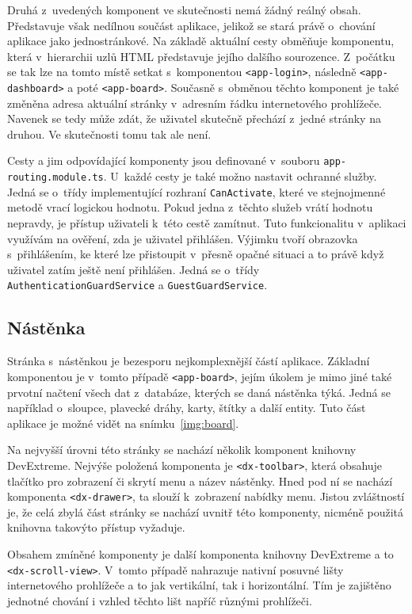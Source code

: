 Druhá z~uvedených komponent ve skutečnosti nemá žádný reálný obsah. Představuje však nedílnou součást aplikace, jelikož se stará právě o~chování aplikace jako jednostránkové. Na základě aktuální cesty obměňuje komponentu, která v~hierarchii uzlů HTML představuje jejího dalšího sourozence. Z~počátku se tak lze na tomto místě setkat s~komponentou \texttt{<app-login>}, následně \texttt{<app-dashboard>} a poté \texttt{<app-board>}. Současně s~obměnou těchto komponent je také změněna adresa aktuální stránky v~adresním řádku internetového prohlížeče. Navenek se tedy může zdát, že uživatel skutečně přechází z~jedné stránky na druhou. Ve skutečnosti tomu tak ale není.

Cesty a jim odpovídající komponenty jsou definované v~souboru \texttt{app-routing.module.ts}. U~každé cesty je také možno nastavit ochranné služby. Jedná se o~třídy implementující rozhraní \texttt{CanActivate}, které ve stejnojmenné metodě vrací logickou hodnotu. Pokud jedna z~těchto služeb vrátí hodnotu nepravdy, je přístup uživateli k~této cestě zamítnut. Tuto funkcionalitu v~aplikaci využívám na ověření, zda je uživatel přihlášen. Výjimku tvoří obrazovka s~přihlášením, ke které lze přistoupit v~přesně opačné situaci a to právě když uživatel zatím ještě není přihlášen. Jedná se o~třídy \texttt{AuthenticationGuardService} a \texttt{GuestGuardService}.


\subsection{Nástěnka}
Stránka s~nástěnkou je bezesporu nejkomplexnější částí aplikace. Základní komponentou je v~tomto případě \texttt{<app-board>}, jejím úkolem je mimo jiné také prvotní načtení všech dat z~databáze, kterých se daná nástěnka týká. Jedná se například o~sloupce, plavecké dráhy, karty, štítky a další entity. Tuto část aplikace je možné vidět na snímku~\ref{img:board}.

Na nejvyšší úrovni této stránky se nachází několik komponent knihovny DevExtreme. Nejvýše položená komponenta je \texttt{<dx-toolbar>}, která obsahuje tlačítko pro zobrazení či skrytí menu a název nástěnky. Hned pod ní se nachází komponenta \texttt{<dx-drawer>}, ta slouží k~zobrazení nabídky menu. Jistou zvláštností je, že celá zbylá část stránky se nachází uvnitř této komponenty, nicméně použitá knihovna takovýto přístup vyžaduje.

Obsahem zmíněné komponenty je další komponenta knihovny DevExtreme a to \texttt{<dx-scroll-view>}. V~tomto případě nahrazuje nativní posuvné lišty internetového prohlížeče a to jak vertikální, tak i horizontální. Tím je zajištěno jednotné chování i vzhled těchto lišt napříč různými prohlížeči.

